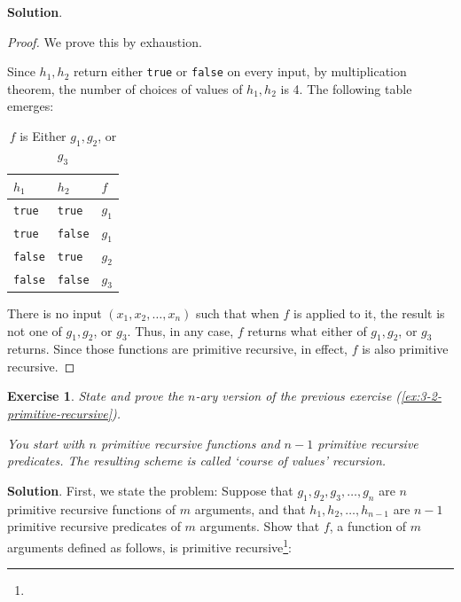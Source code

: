 \documentclass[11pt]{book}
\theoremstyle{definition}
\theoremstyle{plain}
\newtheorem{exercise}{Exercise}[chapter]
\theoremstyle{problemstyle}
\theoremstyle{remark}
\theoremstyle{definition}
\begin{document}
\textbf{Solution}.
\begin{proof}

    We prove this by exhaustion.

    Since $h_1,h_2$ return either \texttt{true} or \texttt{false} on every input, by multiplication theorem, the number of choices of values of $h_1,h_2$ is 4. The following table emerges:
\begin{table}[H]
  \begin{center}
    \caption{$f$ is Either $g_1,g_2$, or $g_3$}
    \label{tab:f-is-g}
    \begin{tabular}{|l|l|l|} 
      \hline
        $h_1$ & $h_2$ & $f$\\
      \hline
        \texttt{true} & \texttt{true} & $g_1$\\
      \hline
        \texttt{true} & \texttt{false} & $g_1$\\
      \hline
        \texttt{false} & \texttt{true} & $g_2$\\
      \hline
        \texttt{false} & \texttt{false} & $g_3$\\
      \hline
    \end{tabular}
  \end{center}
\end{table}

There is no input $(x_1,x_2,\dots,x_n)$ such that when $f$ is applied to it, the result is not one of $g_1,g_2$, or $g_3$. Thus, in any case, $f$ returns what either of $g_1,g_2$, or $g_3$ returns. Since those functions are primitive recursive, in effect, $f$ is also primitive recursive.

\end{proof}
\begin{exercise}
    State and prove the $n$-ary version of the previous exercise (\ref{ex:3-2-primitive-recursive}).

    You start with $n$ primitive recursive functions and $n-1$ primitive recursive predicates. The resulting scheme is called `course of values' recursion.
\end{exercise}
\textbf{Solution}.
First, we state the problem:
    \label{ex:n-primitive-recursive}
    Suppose that $g_1,g_2,g_3,\dots, g_n$ are $n$ primitive recursive functions of $m$ arguments, and that $h_1,h_2,\dots,h_{n-1}$ are $n-1$ primitive recursive predicates of $m$ arguments. Show that $f$, a function of $m$ arguments defined as follows, is primitive recursive\footnote{}:
\end{document}

